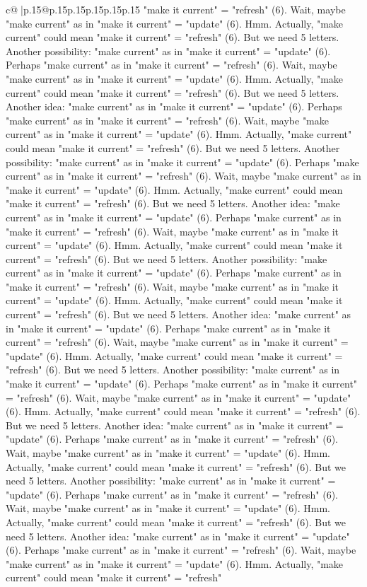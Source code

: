 \documentclass{article}
\begin{document}
{\begin{supertabular}{c@{$\;$}|p{.15\linewidth}@{}p{.15\linewidth}p{.15\linewidth}p{.15\linewidth}p{.15\linewidth}p{.15\linewidth}}
{{{"make it current" = "refresh" (6). Wait, maybe "make current" as in "make it current" = "update" (6). Hmm. Actually, "make current" could mean "make it current" = "refresh" (6). But we need 5 letters. Another possibility: "make current" as in "make it current" = "update" (6). Perhaps "make current" as in "make it current" = "refresh" (6). Wait, maybe "make current" as in "make it current" = "update" (6). Hmm. Actually, "make current" could mean "make it current" = "refresh" (6). But we need 5 letters. Another idea: "make current" as in "make it current" = "update" (6). Perhaps "make current" as in "make it current" = "refresh" (6). Wait, maybe "make current" as in "make it current" = "update" (6). Hmm. Actually, "make current" could mean "make it current" = "refresh" (6). But we need 5 letters. Another possibility: "make current" as in "make it current" = "update" (6). Perhaps "make current" as in "make it current" = "refresh" (6). Wait, maybe "make current" as in "make it current" = "update" (6). Hmm. Actually, "make current" could mean "make it current" = "refresh" (6). But we need 5 letters. Another idea: "make current" as in "make it current" = "update" (6). Perhaps "make current" as in "make it current" = "refresh" (6). Wait, maybe "make current" as in "make it current" = "update" (6). Hmm. Actually, "make current" could mean "make it current" = "refresh" (6). But we need 5 letters. Another possibility: "make current" as in "make it current" = "update" (6). Perhaps "make current" as in "make it current" = "refresh" (6). Wait, maybe "make current" as in "make it current" = "update" (6). Hmm. Actually, "make current" could mean "make it current" = "refresh" (6). But we need 5 letters. Another idea: "make current" as in "make it current" = "update" (6). Perhaps "make current" as in "make it current" = "refresh" (6). Wait, maybe "make current" as in "make it current" = "update" (6). Hmm. Actually, "make current" could mean "make it current" = "refresh" (6). But we need 5 letters. Another possibility: "make current" as in "make it current" = "update" (6). Perhaps "make current" as in "make it current" = "refresh" (6). Wait, maybe "make current" as in "make it current" = "update" (6). Hmm. Actually, "make current" could mean "make it current" = "refresh" (6). But we need 5 letters. Another idea: "make current" as in "make it current" = "update" (6). Perhaps "make current" as in "make it current" = "refresh" (6). Wait, maybe "make current" as in "make it current" = "update" (6). Hmm. Actually, "make current" could mean "make it current" = "refresh" (6). But we need 5 letters. Another possibility: "make current" as in "make it current" = "update" (6). Perhaps "make current" as in "make it current" = "refresh" (6). Wait, maybe "make current" as in "make it current" = "update" (6). Hmm. Actually, "make current" could mean "make it current" = "refresh" (6). But we need 5 letters. Another idea: "make current" as in "make it current" = "update" (6). Perhaps "make current" as in "make it current" = "refresh" (6). Wait, maybe "make current" as in "make it current" = "update" (6). Hmm. Actually, "make current" could mean "make it current" = "refresh" }}}
\end{supertabular}}
\end{document}
